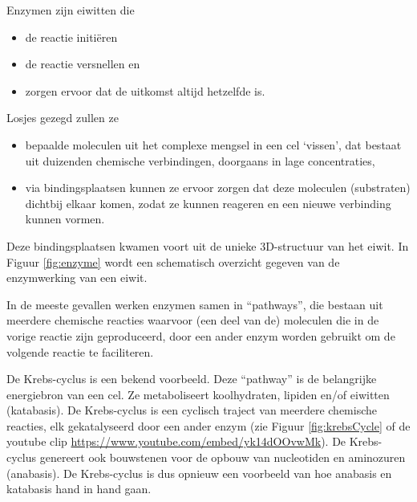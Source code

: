 \documentclass[
  11pt,
]{book}
\providecommand{\tightlist}{%
  \setlength{\itemsep}{0pt}\setlength{\parskip}{0pt}}
\begin{document}
Enzymen zijn eiwitten die

\begin{itemize}
\tightlist
\item
  de reactie initiëren
\item
  de reactie versnellen en
\item
  zorgen ervoor dat de uitkomst altijd hetzelfde is.
\end{itemize}

Losjes gezegd zullen ze

\begin{itemize}
\tightlist
\item
  bepaalde moleculen uit het complexe mengsel in een cel `vissen',
  dat bestaat uit duizenden chemische verbindingen, doorgaans in lage concentraties,
\item
  via bindingsplaatsen kunnen ze ervoor zorgen dat deze moleculen (substraten) dichtbij elkaar komen, zodat ze kunnen reageren en een nieuwe verbinding kunnen vormen.
\end{itemize}

Deze bindingsplaatsen kwamen voort uit de unieke 3D-structuur van het eiwit. In Figuur \ref{fig:enzyme} wordt een schematisch overzicht gegeven van de enzymwerking van een eiwit.

In de meeste gevallen werken enzymen samen in ``pathways'', die bestaan uit meerdere chemische reacties waarvoor (een deel van de) moleculen die in de vorige reactie zijn geproduceerd, door een ander enzym worden gebruikt om de volgende reactie te faciliteren.

De Krebs-cyclus is een bekend voorbeeld. Deze ``pathway'' is de belangrijke energiebron van een cel. Ze metaboliseert koolhydraten, lipiden en/of eiwitten (katabasis). De Krebs-cyclus is een cyclisch traject van meerdere chemische reacties, elk gekatalyseerd door een ander enzym (zie Figuur \ref{fig:krebsCycle} of de youtube clip \url{https://www.youtube.com/embed/yk14dOOvwMk}). De Krebs-cyclus genereert ook bouwstenen voor de opbouw van nucleotiden en aminozuren (anabasis). De Krebs-cyclus is dus opnieuw een voorbeeld van hoe anabasis en katabasis hand in hand gaan.
\end{document}
